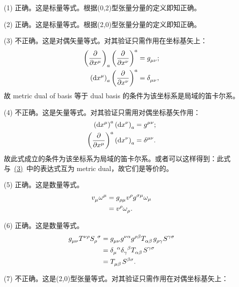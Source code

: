 \begin{xiti}
    \begin{jie}
    	\begin{enumerate}
    		\item[(1)] 正确。这是标量等式。根据(0,2)型张量分量的定义即知正确。
    		\item[(2)] 正确。这是标量等式。根据(2,0)型张量分量的定义即知正确。
    		\item[(3)] 不正确。这是对偶矢量等式。对其验证只需作用在坐标基矢上：
    		\begin{align*}
    		\tensor{\left(\pdv{x^\mu}\right)}{_a} \left(\pdv{x^\nu}\right)^a& =\tensor{g}{_\mu_\nu};\\
    		\tensor{\left(\dd{x^\mu}\right)}{_a}\left(\pdv{x^\nu}\right)^a& =\tensor{\delta}{_\mu_\nu},
    		\end{align*}
    		故 metric dual of basis 等于 dual basis 的条件为该坐标系是局域的笛卡尔系。
    		\item[(4)] 不正确。这是矢量等式。对其验证只需用对偶坐标基矢作用：
    		\begin{align*}
    		\tensor{\left(\dd{x^\mu}\right)}{^a}\tensor{\left(\dd{x^\nu}\right)}{_a} &=\tensor{g}{^\mu^\nu};\\
    		\tensor{\left(\pdv{x^\mu} \right)}{^a}\tensor{\left(\dd{x^\nu}\right)}{_a} &=\tensor{\delta}{^\mu^\nu}.
    		\end{align*}
    		故此式成立的条件为该坐标系为局域的笛卡尔系。或者可以这样得到：此式与~\hyperlink{2.23.3}{(3)}~中的表达式互为 metric dual，故它们是等价的。
    		\item[(5)] 正确。这是数量等式。
    		\begin{align*}
    		\tensor{v}{_\mu} \omega^\mu&=\tensor{g}{_\rho_\mu}v^\rho \tensor{g}{^\sigma^\mu}\omega_\mu\\
    		&=v^\rho \tensor{\omega}{_\rho}.
    		\end{align*}
    		\item[(6)] 正确。这是数量等式。
    		\begin{align*}
    		\tensor{g}{_\mu_\nu}\tensor{T}{^\nu^\rho}\tensor{S}{_\rho^\sigma}&=\tensor{g}{_\mu_\nu}\tensor{g}{^\nu^\alpha}\tensor{g}{^\rho^\beta}\tensor{T}{_\alpha_\beta}\tensor{g}{_\rho_\gamma}\tensor{S}{^\gamma^\sigma}\\
    		&=\tensor{\delta}{_\mu^\alpha}\tensor{\delta}{_\gamma^\beta}\tensor{T}{_\alpha_\beta}\tensor{S}{^\gamma^\sigma}\\
    		&=\tensor{T}{_\mu_\beta}\tensor{S}{^\beta^\sigma}.
    		\end{align*}
    		\item[(7)] 不正确。这是(2,0)型张量等式。对其验证只需作用在对偶坐标基矢上：

\end{enumerate}
\end{jie}
\end{xiti}
